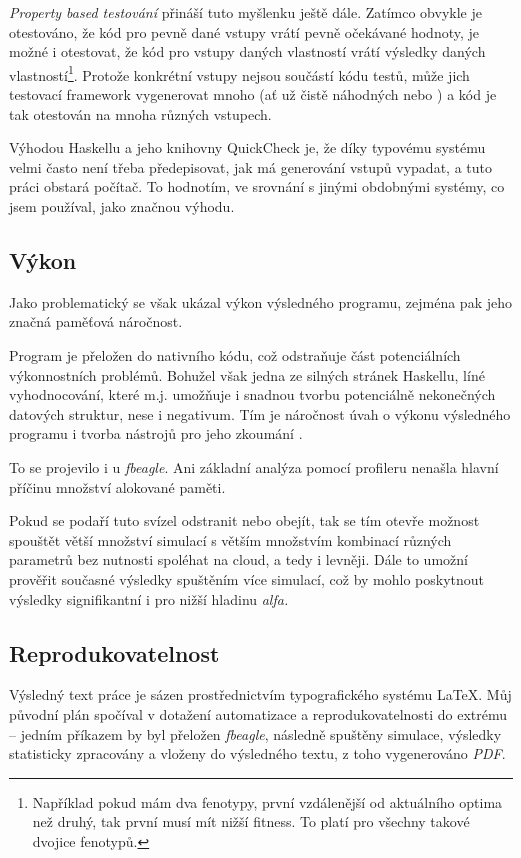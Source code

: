 \textit{Property based testování} přináší tuto myšlenku ještě dále. Zatímco obvykle je otestováno, že kód pro pevně dané vstupy vrátí pevně
očekávané hodnoty, je možné i otestovat, že kód pro vstupy daných vlastností vrátí výsledky daných vlastností\footnote{
Například pokud mám dva fenotypy, první vzdálenější od aktuálního optima než druhý, tak první musí mít nižší fitness.
To platí pro všechny takové dvojice fenotypů.
}. Protože konkrétní vstupy nejsou součástí kódu testů, může jich testovací framework vygenerovat mnoho (ať už čistě náhodných nebo )
a kód je tak otestován na mnoha různých vstupech.

Výhodou Haskellu a jeho knihovny QuickCheck \citep{Claessen:2000:QLT:351240.351266} je, že díky typovému systému velmi
často není třeba předepisovat, jak má generování vstupů vypadat, a tuto práci obstará počítač.
To hodnotím, ve srovnání s jinými obdobnými systémy, co jsem používal, jako značnou výhodu.

\subsection{Výkon}

Jako problematický se však ukázal výkon výsledného programu, zejména pak jeho značná paměťová náročnost.

Program je přeložen do nativního kódu, což odstraňuje část potenciálních výkonnostních problémů. Bohužel však jedna ze silných stránek
Haskellu, líné vyhodnocování, které m.j. umožňuje i snadnou tvorbu potenciálně nekonečných datových struktur, nese i negativum.
Tím je náročnost úvah o výkonu výsledného programu i tvorba nástrojů pro jeho zkoumání \citep{wadler1998no}.

To se projevilo i u \textit{fbeagle}. Ani základní analýza pomocí profileru nenašla hlavní příčinu množství alokované paměti.

Pokud se podaří tuto svízel odstranit nebo obejít, tak se tím otevře možnost spouštět větší množství simulací s větším množstvím kombinací
různých parametrů bez nutnosti spoléhat na cloud, a tedy i levněji. Dále to umožní prověřit současné výsledky spuštěním více simulací, což by
mohlo poskytnout výsledky signifikantní i pro nižší hladinu \textit{alfa.}

\subsection{Reprodukovatelnost}

Výsledný text práce je sázen prostřednictvím typografického systému \LaTeX. Můj původní plán spočíval v dotažení
automatizace a reprodukovatelnosti do extrému -- jedním příkazem by byl přeložen \textit{fbeagle}, následně
spuštěny simulace, výsledky statisticky zpracovány a vloženy do výsledného textu, z toho vygenerováno \textit{PDF}.

